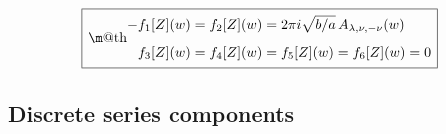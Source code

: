 \documentclass[12pt]{article}
\makeatletter
\newcommand*{\wideboxed}[1]{\setlength{\fboxsep}{1ex}%
  \fbox{\m@th$\displaystyle#1$}}
\makeatother
\begin{document}
\begin{equation} \label{Zwf}
\wideboxed{
\begin{aligned}
-f_{1}[Z](w)&=f_{2}[Z](w)=2\pi i\sqrt{b/a}\,A_{\lambda,\nu,-\nu}(w)
\\[5pt]
f_{3}[Z](w)&=f_{4}[Z](w)=f_{5}[Z](w)=f_{6}[Z](w)=0
\end{aligned}
}
\end{equation}

\subsection{Discrete series components} \label{app:disc}
\end{document}
